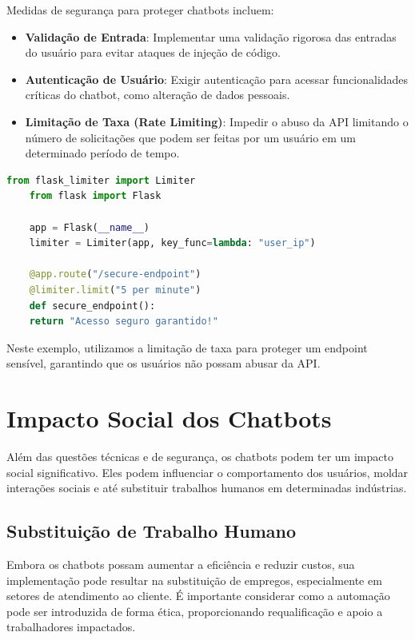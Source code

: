 \documentclass[14pt,a4paper,oneside]{book}
\begin{document}
Medidas de segurança para proteger chatbots incluem:

\begin{itemize}
	\item \textbf{Validação de Entrada}: Implementar uma validação rigorosa das entradas do usuário para evitar ataques de injeção de código.
	\item \textbf{Autenticação de Usuário}: Exigir autenticação para acessar funcionalidades críticas do chatbot, como alteração de dados pessoais.
	\item \textbf{Limitação de Taxa (Rate Limiting)}: Impedir o abuso da API limitando o número de solicitações que podem ser feitas por um usuário em um determinado período de tempo.
\end{itemize}

\begin{lstlisting}[language=Python]
	from flask_limiter import Limiter
	from flask import Flask
	
	app = Flask(__name__)
	limiter = Limiter(app, key_func=lambda: "user_ip")
	
	@app.route("/secure-endpoint")
	@limiter.limit("5 per minute")
	def secure_endpoint():
	return "Acesso seguro garantido!"
\end{lstlisting}

Neste exemplo, utilizamos a limitação de taxa para proteger um endpoint sensível, garantindo que os usuários não possam abusar da API.

\section{Impacto Social dos Chatbots}

Além das questões técnicas e de segurança, os chatbots podem ter um impacto social significativo. Eles podem influenciar o comportamento dos usuários, moldar interações sociais e até substituir trabalhos humanos em determinadas indústrias.

\subsection{Substituição de Trabalho Humano}

Embora os chatbots possam aumentar a eficiência e reduzir custos, sua implementação pode resultar na substituição de empregos, especialmente em setores de atendimento ao cliente. É importante considerar como a automação pode ser introduzida de forma ética, proporcionando requalificação e apoio a trabalhadores impactados.
\end{document}
